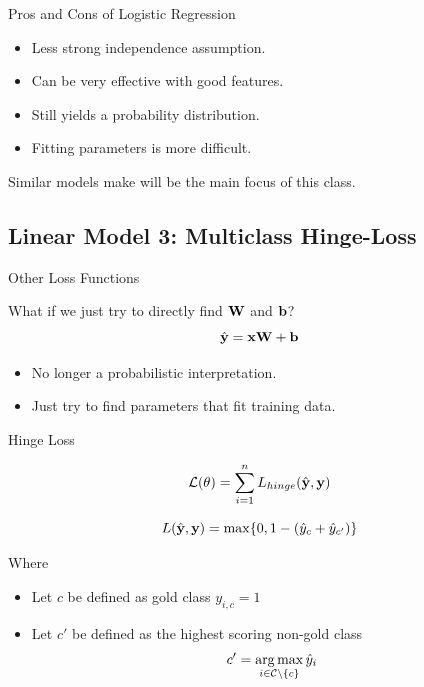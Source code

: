 \documentclass{beamer}
\begin{document}
\begin{frame}{Pros and Cons of Logistic Regression}
  \begin{itemize}
  \item Less strong independence assumption.
  \item Can be very effective with good features.
  \item Still yields a probability distribution.
  \item Fitting parameters is more difficult.
  \end{itemize}
  
  Similar models make will be the main focus of this class.
\end{frame}


\subsection{Linear Model 3: Multiclass Hinge-Loss}


\begin{frame}{Other Loss Functions}
  
  What if we just try to directly find $\mathbf{W}$ and $\mathbf{b}$? 
     \[\hat{\mathbf{y}} = \mathbf{x} \mathbf{W} + \mathbf{b}\]   
     
     \begin{itemize}
     \item No longer a probabilistic interpretation.
     \item Just try to find parameters that fit training data.
     \end{itemize}

\end{frame}


\begin{frame}{Hinge Loss}

  \[{\mathcal{L}(\theta)} = \sum_{i=1}^n L_{hinge}(\hat{\mathbf{y}}, \mathbf{y}) \] 


  \[ L(\hat{\mathbf{y}}, \mathbf{y}) =  \max\{0, 1 - (\hat{y}_{c} + \hat{y}_{c'}) \}  \]

  Where 
  \begin{itemize}
  \item   Let $c$ be defined as gold class $y_{i, c} = 1$  
  \item   Let $c'$ be defined as the highest scoring non-gold class 
    \[c' = \argmax_{i \in \mcC \setminus\{c\}} \hat{y}_i \] 
  \end{itemize}


\end{frame}
\end{document}
